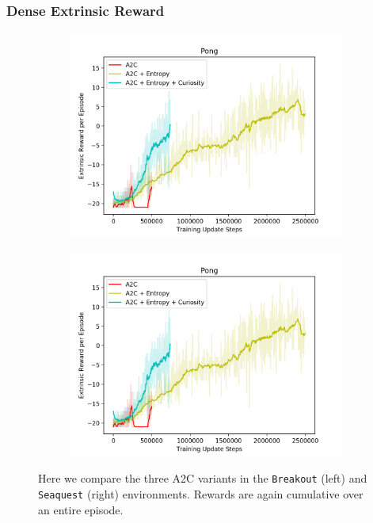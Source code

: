 \documentclass{article}
\begin{document}
\subsubsection{Dense Extrinsic Reward}
\begin{figure}
\centering
\begin{subfigure}{.5\textwidth}
  \centering
  \includegraphics[width=1.\linewidth]{figures/pong_rewards}
\end{subfigure}%
\begin{subfigure}{.5\textwidth}
  \centering
  \includegraphics[width=1.\linewidth]{figures/pong_rewards}
\end{subfigure}
\caption{Here we compare the three A2C variants in the \texttt{Breakout} (left) and \texttt{Seaquest} (right) environments. Rewards are again cumulative over an entire episode.}
\label{fig:seaquest-breakout-reward}
\end{figure}
\end{document}
